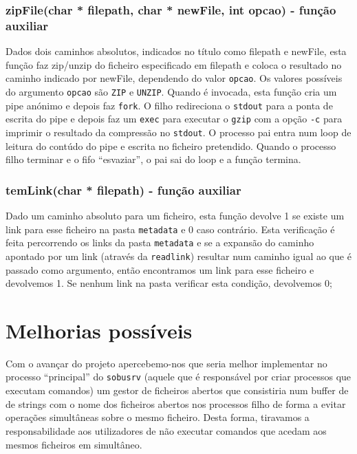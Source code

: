 \documentclass[a4paper,12pt,titlepage,portuguese]{article}
\begin{document}
\subsubsection{ zipFile(char * filepath, char * newFile, int opcao) - função auxiliar}

Dados dois caminhos absolutos, indicados no título como filepath e newFile, esta função faz zip/unzip do ficheiro especificado em filepath e coloca o resultado no caminho indicado por newFile, dependendo do valor \texttt{opcao}. Os valores possíveis do argumento \texttt{opcao} são \texttt{ZIP} e \texttt{UNZIP}. Quando é invocada, esta função cria um pipe anónimo e depois faz \texttt{fork}. O filho redireciona o \texttt{stdout} para a ponta de escrita do pipe e depois faz um \texttt{exec} para executar o \texttt{gzip} com a opção \texttt{-c} para imprimir o resultado da compressão no \texttt{stdout}. O processo pai entra num loop de leitura do contúdo do pipe e escrita no ficheiro pretendido. Quando o processo filho terminar e o fifo ``esvaziar'', o pai sai do loop e a função termina.

\subsubsection{ temLink(char * filepath) - função auxiliar}
Dado um caminho absoluto para um ficheiro, esta função devolve 1 se existe um link para esse ficheiro na pasta \texttt{metadata} e 0 caso contrário. Esta verificação é feita percorrendo os links da pasta \texttt{metadata} e se a expansão do caminho apontado por um link (através da \texttt{readlink}) resultar num caminho igual ao que é passado como argumento, então encontramos um link para esse ficheiro e devolvemos 1. Se nenhum link na pasta verificar esta condição, devolvemos 0;

\section{Melhorias possíveis}

Com o avançar do projeto apercebemo-nos que seria melhor implementar no processo ``principal'' do \texttt{sobusrv} 
(aquele que é responsável por criar processos que executam comandos) um gestor de ficheiros abertos que consistiria num buffer de de strings com o nome dos ficheiros abertos nos processos filho de forma a evitar operações simultâneas sobre o mesmo ficheiro. Desta forma, tiravamos a responsabilidade aos utilizadores de não executar comandos que acedam aos mesmos ficheiros em simultâneo.
\end{document}
